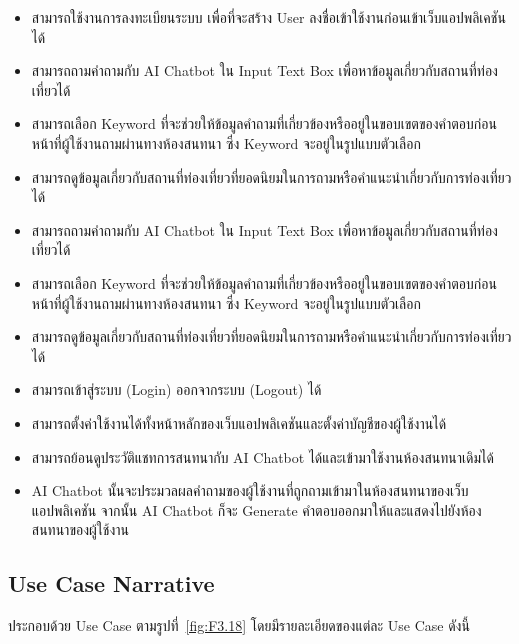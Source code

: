 \documentclass[12pt,oneside,openright,a4paper]{cpe-thai-project}
\begin{document}
\begin{itemize}
\item สามารถใช้งานการลงทะเบียนระบบ เพื่อที่จะสร้าง User ลงชื่อเข้าใช้งานก่อนเข้าเว็บแอปพลิเคชันได้
\item สามารถถามคำถามกับ AI Chatbot ใน Input Text Box เพื่อหาข้อมูลเกี่ยวกับสถานที่ท่องเที่ยวได้
\item สามารถเลือก Keyword ที่จะช่วยให้ข้อมูลคำถามที่เกี่ยวข้องหรืออยู่ในขอบเขตของคำตอบก่อนหน้าที่ผู้ใช้งานถามผ่านทางห้องสนทนา ซึ่ง Keyword จะอยู่ในรูปแบบตัวเลือก
\item สามารถดูข้อมูลเกี่ยวกับสถานที่ท่องเที่ยวที่ยอดนิยมในการถามหรือคำแนะนำเกี่ยวกับการท่องเที่ยวได้
\end{itemize}

\begin{itemize}
\item สามารถถามคำถามกับ AI Chatbot ใน Input Text Box เพื่อหาข้อมูลเกี่ยวกับสถานที่ท่องเที่ยวได้
\item สามารถเลือก Keyword ที่จะช่วยให้ข้อมูลคำถามที่เกี่ยวข้องหรืออยู่ในขอบเขตของคำตอบก่อนหน้าที่ผู้ใช้งานถามผ่านทางห้องสนทนา ซึ่ง Keyword จะอยู่ในรูปแบบตัวเลือก
\item สามารถดูข้อมูลเกี่ยวกับสถานที่ท่องเที่ยวที่ยอดนิยมในการถามหรือคำแนะนำเกี่ยวกับการท่องเที่ยวได้
\item สามารถเข้าสู่ระบบ (Login) ออกจากระบบ (Logout) ได้
\item สามารถตั้งค่าใช้งานได้ทั้งหน้าหลักของเว็บแอปพลิเคชันและตั้งค่าบัญชีของผู้ใช้งานได้
\item สามารถย้อนดูประวัติแชทการสนทนากับ AI Chatbot ได้และเข้ามาใช้งานห้องสนทนาเดิมได้
\end{itemize}

\begin{itemize}
\item AI Chatbot นั้นจะประมวลผลคำถามของผู้ใช้งานที่ถูกถามเข้ามาในห้องสนทนาของเว็บแอปพลิเคชัน จากนั้น AI Chatbot ก็จะ Generate คำตอบออกมาให้และแสดงไปยังห้องสนทนาของผู้ใช้งาน
\end{itemize}

\subsection{Use Case Narrative}
ประกอบด้วย Use Case ตามรูปที่~\ref{fig:F3.18} โดยมีรายละเอียดของแต่ละ Use Case ดังนี้
\end{document}
